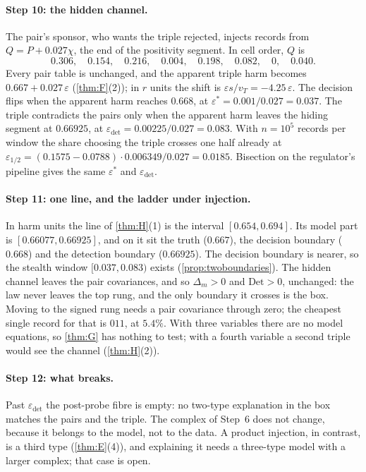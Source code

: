 \documentclass[11pt]{article}
\theoremstyle{definition}\newtheorem{definition}{Definition}\newtheorem{remark}{Remark}
\begin{document}
\paragraph{Step 10: the hidden channel.} The pair's sponsor, who wants the triple rejected, injects records from $Q=P+0.027\chi$, the
end of the positivity segment. In cell order, $Q$ is
\[
0.306,\quad0.154,\quad0.216,\quad0.004,\quad0.198,\quad0.082,\quad0,\quad0.040 .
\]
Every pair table is unchanged, and the apparent triple harm becomes $0.667+0.027\,\varepsilon$ (\cref{thm:F}(2)); in $r$ units the shift is
$\varepsilon s/v_T=-4.25\,\varepsilon$. The decision flips when the apparent harm reaches $0.668$, at $\varepsilon^*=0.001/0.027=0.037$. The
triple contradicts the pairs only when the apparent harm leaves the hiding segment at $0.66925$, at $\varepsilon_{\det}=0.00225/0.027=0.083$.
With $n=10^5$ records per window the share choosing the triple crosses one half already at
$\varepsilon_{1/2}=(0.1575-0.0788)\cdot0.006349/0.027=0.0185$. Bisection on the regulator's pipeline gives the same $\varepsilon^*$ and
$\varepsilon_{\det}$.

\paragraph{Step 11: one line, and the ladder under injection.} In harm units the line of \cref{thm:H}(1) is the interval $[0.654,0.694]$.
Its model part is $[0.66077,0.66925]$, and on it sit the truth ($0.667$), the decision boundary ($0.668$) and the detection boundary
($0.66925$). The decision boundary is nearer, so the stealth window $[0.037,0.083)$ exists (\cref{prop:twoboundaries}). The hidden channel
leaves the pair covariances, and so $\Delta_m>0$ and $\mathrm{Det}>0$, unchanged: the law never leaves the top rung, and the only boundary
it crosses is the box. Moving to the signed rung needs a pair covariance through zero; the cheapest single record for that is $011$, at
$5.4\%$. With three variables there are no model equations, so \cref{thm:G} has nothing to test; with a fourth variable a second triple
would see the channel (\cref{thm:H}(2)).

\paragraph{Step 12: what breaks.} Past $\varepsilon_{\det}$ the post-probe fibre is empty: no two-type explanation in the box matches the
pairs and the triple. The complex of Step~6 does not change, because it belongs to the model, not to the data. A product injection, in
contrast, is a third type (\cref{thm:E}(4)), and explaining it needs a three-type model with a larger complex; that case is open.
\end{document}
